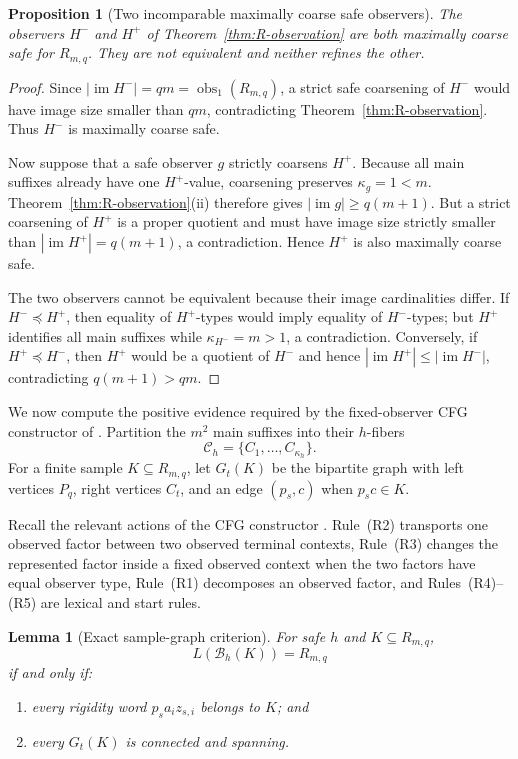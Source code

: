 \documentclass[11pt]{article}
\newtheorem{proposition}[theorem]{Proposition}
\newtheorem{lemma}[theorem]{Lemma}
\theoremstyle{definition}
\theoremstyle{remark}
\newcommand{\im}{\operatorname{im}}
\newcommand{\obs}{\operatorname{obs}}
\begin{document}
\begin{proposition}[Two incomparable maximally coarse safe observers]
\label{prop:R-coarsest}
The observers \(H^-\) and \(H^+\) of
Theorem~\ref{thm:R-observation} are both maximally coarse safe for \(R_{m,q}\).
They are not equivalent and neither refines the other.
\end{proposition}

\begin{proof}
Since \(|\im H^-|=qm=\obs_1(R_{m,q})\), a strict safe coarsening of
\(H^-\) would have image size smaller than \(qm\), contradicting
Theorem~\ref{thm:R-observation}.  Thus \(H^-\) is maximally coarse safe.

Now suppose that a safe observer \(g\) strictly coarsens \(H^+\).  Because
all main suffixes already have one \(H^+\)-value, coarsening preserves
\(\kappa_g=1<m\).  Theorem~\ref{thm:R-observation}(ii) therefore gives
\(|\im g|\ge q(m+1)\).  But a strict coarsening of \(H^+\) is a proper
quotient and must have image size strictly smaller than
\(|\im H^+|=q(m+1)\), a contradiction.  Hence \(H^+\) is also maximally coarse
safe.

The two observers cannot be equivalent because their image cardinalities
differ.  If \(H^-\preceq H^+\), then equality of \(H^+\)-types would imply
equality of \(H^-\)-types; but \(H^+\) identifies all main suffixes while
\(\kappa_{H^-}=m>1\), a contradiction.  Conversely, if
\(H^+\preceq H^-\), then \(H^+\) would be a quotient of \(H^-\) and hence
\(|\im H^+|\le|\im H^-|\), contradicting \(q(m+1)>qm\).
\end{proof}
We now compute the positive evidence required by the fixed-observer CFG
constructor of \cite{KuriyamaCFG}.  Partition the \(m^2\) main suffixes into
their \(h\)-fibers
\[
 \mathcal C_h=\{C_1,\ldots,C_{\kappa_h}\}.
\]
For a finite sample \(K\subseteq R_{m,q}\), let \(G_t(K)\) be the bipartite
graph with left vertices \(P_q\), right vertices \(C_t\), and an edge
\((p_s,c)\) when \(p_sc\in K\).

Recall the relevant actions of the CFG constructor \cite{KuriyamaCFG}.
Rule~(R2) transports one observed factor between two observed terminal
contexts, Rule~(R3) changes the represented factor inside a fixed observed
context when the two factors have equal observer type, Rule~(R1) decomposes an
observed factor, and Rules~(R4)--(R5) are lexical and start rules.

\begin{lemma}[Exact sample-graph criterion]
\label{lem:R-graph}
For safe \(h\) and \(K\subseteq R_{m,q}\),
\[
 L(\mathcal B_h(K))=R_{m,q}
\]
if and only if:
\begin{enumerate}[label=(\roman*),leftmargin=*]
\item every rigidity word \(p_sa_i z_{s,i}\) belongs to \(K\); and
\item every \(G_t(K)\) is connected and spanning.
\end{enumerate}
\end{lemma}
\end{document}
